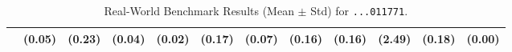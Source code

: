 \begin{table}[ht]
{\begin{tabular}{l cccc cccc cc c}
                                    & (0.05)                                          & (0.23)                                       & (0.04)                                        & (0.02)                  & (0.17)            & (0.07)         & (0.16)         & (0.16)         & (2.49)          & (0.18)           & (0.00)            \\
            \bottomrule
        \end{tabular}%
    }
    \caption{Real-World Benchmark Results (Mean $\pm$ Std) for \texttt{...011771}.}
    \label{tab:real_world_results2}

\end{table}